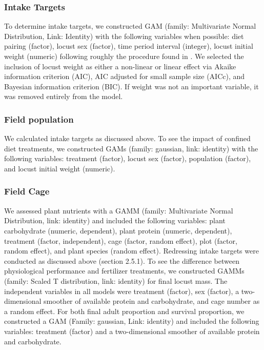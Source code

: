 \documentclass[
]{article}
\begin{document}
\subsubsection{Intake Targets}\label{intake-targets}

To determine intake targets, we constructed GAM (family: Multivariate
Normal Distribution, Link: Identity) with the following variables when
possible: diet pairing (factor), locust sex (factor), time period
interval (integer), locust initial weight (numeric) following roughly
the procedure found in \citet{lawton_mismatched_2021}. We selected the
inclusion of locust weight as either a non-linear or linear effect via
Akaike information criterion (AIC), AIC adjusted for small sample size
(AICc), and Bayesian information criterion (BIC). If weight was not an
important variable, it was removed entirely from the model.

\subsubsection{Field population}\label{field-population}

We calculated intake targets as discussed above. To see the impact of
confined diet treatments, we constructed GAMs (family: gaussian, link:
identity) with the following variables: treatment (factor), locust sex
(factor), population (factor), and locust initial weight (numeric).

\subsubsection{Field Cage}\label{field-cage}

We assessed plant nutrients with a GAMM (family: Multivariate Normal
Distribution, link: identity) and included the following variables:
plant carbohydrate (numeric, dependent), plant protein (numeric,
dependent), treatment (factor, independent), cage (factor, random
effect), plot (factor, random effect), and plant species (random
effect). Redressing intake targets were conducted as discussed above
(section 2.5.1). To see the difference between physiological performance
and fertilizer treatments, we constructed GAMMs (family: Scaled T
distribution, link: identity) for final locust mass. The independent
variables in all models were treatment (factor), sex (factor), a
two-dimensional smoother of available protein and carbohydrate, and cage
number as a random effect. For both final adult proportion and survival
proportion, we constructed a GAM (Family: gaussian, Link: identity) and
included the following variables: treatment (factor) and a
two-dimensional smoother of available protein and carbohydrate.
\end{document}
